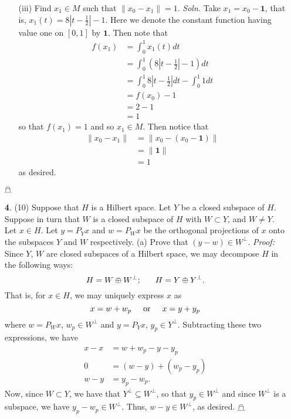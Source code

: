 \documentclass{article}
\begin{document}
\begin{itemize}
\begin{itemize}
        \item[(iii)] Find $x_1 \in M$ such that $\|x_0 - x_1\| = 1$.
        \newline\newline
        \textit{Soln.} Take $x_1 = x_0 - \mathbf{1}$, that is, $x_1(t) = 8|t - \tfrac{1}{2}| - 1$. Here we denote the constant function having value one on $[0,1]$ by $\mathbf{1}$. Then note that 
        \begin{align*}
            f(x_1) &= \int_0^1 x_1(t)dt\\
            &= \int_0^1 (8|t - \tfrac{1}{2}| - 1)dt\\
            &= \int_0^1 8|t - \tfrac{1}{2}| dt - \int_0^1 1dt\\
            &= f(x_0) - 1\\
            &= 2 - 1\\
            &= 1
        \end{align*}
        so that $f(x_1) = 1$ and so $x_1 \in M$. Then notice that
        \begin{align*}
            \|x_0 - x_1\| &= \|x_0 - (x_0 - \mathbf{1})\|\\
            &= \|\mathbf{1}\|\\
            &= 1
        \end{align*}
        as desired.
    \end{itemize} \hfill $\mathghost$
    \pagebreak
    \item[\textbf{4}.] (10) Suppose that $H$ is a Hilbert space. Let $Y$ be a closed subspace of $H$. Suppose in turn that $W$ is a closed subspace of $H$ with $W \subset Y$, and $W \neq Y$. Let $x \in H$. Let $y = P_Yx$ and $w = P_Wx$ be the orthogonal projections of $x$ onto the subspaces $Y$ and $W$ respectively.
    \newline
    (a) Prove that $(y - w) \in W^{\perp}$.
    \newline\newline
    \textit{Proof:} Since $Y$, $W$ are closed subspaces of a Hilbert space, we may decompose $H$ in the following ways:
    \[H = W \oplus W^{\perp}; \hspace{0.6cm} H = Y \oplus Y^{\perp}.\]
    That is, for $x \in H$, we may uniquely express $x$ as 
    \[x = w + w_p \hspace{0.5cm} \text{or} \hspace{0.5cm} x = y + y_p\]
    where $w = P_Wx$, $w_p \in W^{\perp}$ and $y = P_Yx$, $y_p \in Y^{\perp}$. Subtracting these two expressions, we have
    \begin{align*}
        x - x &= w + w_p - y - y_p\\
        0 &= (w - y) + (w_p - y_p)\\
        w - y &= y_p - w_p.
    \end{align*}
    Now, since $W \subset Y$, we have that $Y^{\perp} \subseteq W^{\perp}$, so that $y_p \in W^{\perp}$ and since $W^{\perp}$ is a subspace, we have $y_p - w_p \in W^{\perp}$. Thus, $w - y \in W^{\perp}$, as desired. \hfill $\mathghost$
    \newline


\end{itemize}
\end{document}
